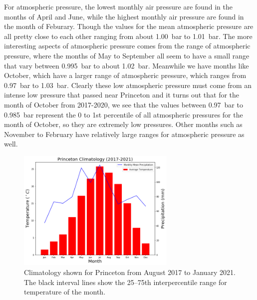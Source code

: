 \documentclass[11pt]{report}
\begin{document}
For atmospheric pressure, the lowest monthly air pressure are found in the
months of April and June, while the highest monthly air pressure are found
in the month of Feburary. Though the values for the mean atmospheric
pressure are all pretty close to each other ranging from about 1.00~bar to
1.01~bar. The more interesting aspects of atmospheric pressure comes from
the range of atmospheric pressure, where the months of May to September all
seem to have a small range that vary between 0.995~bar to about
1.02~bar. Meanwhile we have months like October, which have a larger range
of atmospheric pressure, which ranges from 0.97~bar to 1.03~bar. Clearly
these low atmospheric pressure must come from an intense low pressure that
passed near Princeton and it turns out that for the month of October from
2017-2020, we see that the values between 0.97~bar to 0.985~bar represent
the 0 to 1st percentile of all atmospheric pressures for the month of
October, so they are extremely low pressures. Other months such as November
to February have relatively large ranges for atmospheric pressure as well.
\clearpage
\begin{figure}[b]
	\centering
	\includegraphics[width=0.675\textwidth]{Figures/Climate1.png}
	\caption[Climatology of temperature and precipitation of Princeton
          (2017--2021)]{\label{Clim1} Climatology shown for Princeton from
          August 2017 to January 2021. The black interval lines show the
          25--75th interpercentile range for temperature of the month.}
\end{figure}
\end{document}
